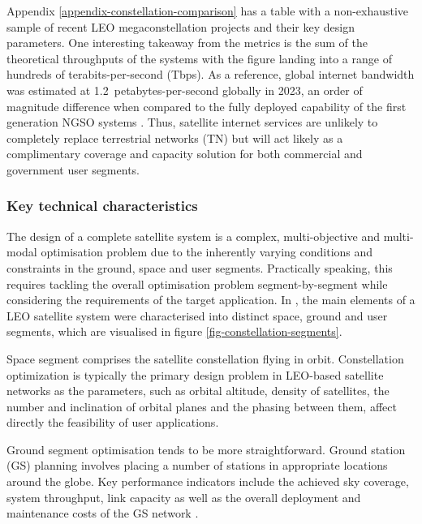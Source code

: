 \documentclass[english, 12pt, a4paper, elec, utf8, a-1b, online]{aaltothesis}
\begin{document}
Appendix \ref{appendix-constellation-comparison} has a table with a non-exhaustive sample of recent LEO megaconstellation projects and their key design parameters.
One interesting takeaway from the metrics is the sum of the theoretical throughputs of the systems with the figure landing into a range of hundreds of terabits-per-second (Tbps).
As a reference, global internet bandwidth was estimated at 1.2~petabytes-per-second globally in 2023, an order of magnitude difference when compared to the fully deployed capability of the first generation NGSO systems \cite{telegeography-ip-networks-2023}.
Thus, satellite internet services are unlikely to completely replace terrestrial networks (TN) but will act likely as a complimentary coverage and capacity solution for both commercial and government user segments.

\subsubsection{Key technical characteristics} \label{ch-constellation-characteristics}
The design of a complete satellite system is a complex, multi-objective and multi-modal optimisation problem due to the inherently varying conditions and constraints in the ground, space and user segments.
Practically speaking, this requires tackling the overall optimisation problem segment-by-segment while considering the requirements of the target application.
In \cite{celikbilek2022survey}, the main elements of a LEO satellite system were characterised into distinct space, ground and user segments, which are visualised in figure \ref{fig-constellation-segments}. %

Space segment comprises the satellite constellation flying in orbit.
Constellation optimization is typically the primary design problem in LEO-based satellite networks as the parameters, such as orbital altitude, density of satellites, the number and inclination of orbital planes and the phasing between them, affect directly the feasibility of user applications.%

Ground segment optimisation tends to be more straightforward.
Ground station (GS) planning involves placing a number of stations in appropriate locations around the globe.
Key performance indicators include the achieved sky coverage, system throughput, link capacity as well as the overall deployment and maintenance costs of the GS network \cite{celikbilek2022survey}.
\end{document}
